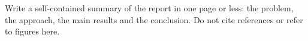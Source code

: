 
Write a self-contained summary of the report in one page or less: the problem, the approach, the main
results and the conclusion. Do not cite references or refer to figures here.

